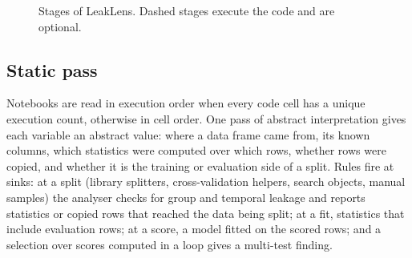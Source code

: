 \documentclass[10pt,a4paper,twocolumn]{article}
\newcommand{\tool}{LeakLens}
\newcommand{\code}[1]{\texttt{#1}}
\begin{document}
\begin{figure}[t]
\centering
{}
\caption{Stages of \tool{}. Dashed stages execute the code and are optional.}
\label{fig:pipeline}
\end{figure}

\subsection{Static pass}
\label{sec:static}

Notebooks are read in execution order when every code cell has a unique execution count, otherwise in cell order.
One pass of abstract interpretation gives each variable an abstract value: where a data frame came from, its known
columns, which statistics were computed over which rows, whether rows were copied, and whether it is the training
or evaluation side of a split. Rules fire at sinks: at a split (library splitters, cross-validation helpers, search
objects, manual samples) the analyser checks for group and temporal leakage and reports statistics or copied rows
that reached the data being split; at a fit, statistics that include evaluation rows; at a score, a model fitted on
the scored rows; and a selection over scores computed in a loop gives a multi-test finding.
\end{document}
